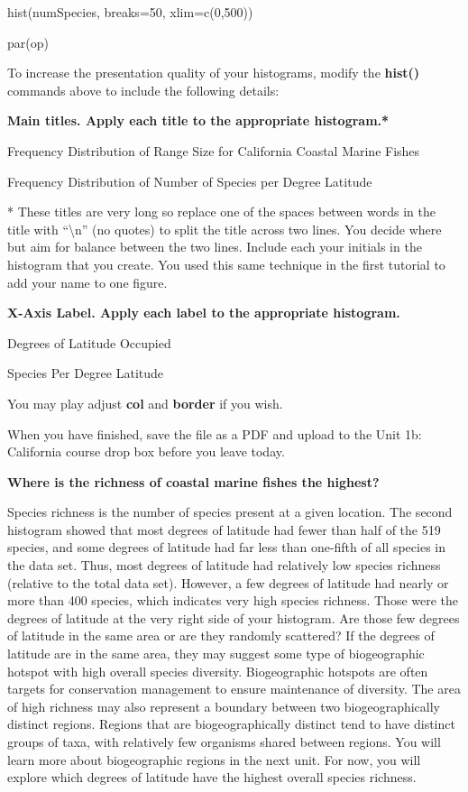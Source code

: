 hist(numSpecies, breaks=50, xlim=c(0,500))

par(op)

To increase the presentation quality of your histograms, modify the
\textbf{hist()} commands above to include the following details:

\textbf{Main titles. Apply each title to the appropriate histogram.*}

Frequency Distribution of Range Size for California Coastal Marine
Fishes

Frequency Distribution of Number of Species per Degree Latitude

* These titles are very long so replace one of the spaces between words
in the title with ``\textbackslash{}n'' (no quotes) to split the title
across two lines. You decide where but aim for balance between the two
lines. Include each your initials in the histogram that you create. You
used this same technique in the first tutorial to add your name to one
figure.

\textbf{X-Axis Label. Apply each label to the appropriate histogram.}

Degrees of Latitude Occupied

Species Per Degree Latitude

You may play adjust \textbf{col} and \textbf{border} if you wish.

When you have finished, save the file as a PDF and upload to the Unit
1b: California course drop box before you leave today.

\textbf{Where is the richness of coastal marine fishes the highest?}

Species richness is the number of species present at a given location.
The second histogram showed that most degrees of latitude had fewer than
half of the 519 species, and some degrees of latitude had far less than
one-fifth of all species in the data set. Thus, most degrees of latitude
had relatively low species richness (relative to the total data set).
However, a few degrees of latitude had nearly or more than 400 species,
which indicates very high species richness. Those were the degrees of
latitude at the very right side of your histogram. Are those few degrees
of latitude in the same area or are they randomly scattered? If the
degrees of latitude are in the same area, they may suggest some type of
biogeographic hotspot with high overall species diversity. Biogeographic
hotspots are often targets for conservation management to ensure
maintenance of diversity. The area of high richness may also represent a
boundary between two biogeographically distinct regions. Regions that
are biogeographically distinct tend to have distinct groups of taxa,
with relatively few organisms shared between regions. You will learn
more about biogeographic regions in the next unit. For now, you will
explore which degrees of latitude have the highest overall species
richness.

